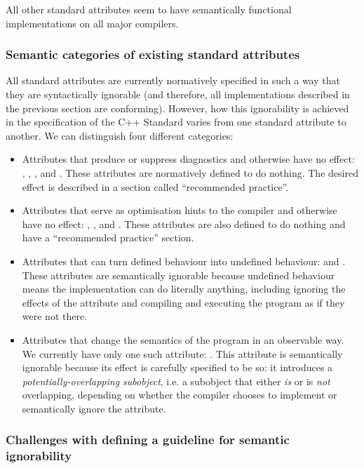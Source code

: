 All other standard attributes seem to have semantically functional implementations on all major compilers.

\subsubsection{Semantic categories of existing standard attributes}
\label{subsubsec:attributecategories}

All standard attributes are currently normatively specified in such a way that they are syntactically ignorable (and therefore, all implementations described in the previous section are conforming). However, how this ignorability is achieved in the specification of the C++ Standard varies from one standard attribute to another. We can distinguish four different categories:

\begin{itemize}
\item Attributes that produce or suppress diagnostics and otherwise have no effect: , , , and . These attributes are normatively defined to do nothing. The desired effect is described in a section called ``recommended practice''.
\item Attributes that serve as optimisation hints to the compiler and otherwise have no effect: , , and . These attributes are also defined to do nothing and have a ``recommended practice'' section.
\item Attributes that can turn defined behaviour into undefined behaviour:  and . These attributes are semantically ignorable because undefined behaviour means the implementation can do literally anything, including ignoring the effects of the attribute and compiling and executing the program as if they were not there.
\item Attributes that change the semantics of the program in an observable way. We currently have only one such attribute: . This attribute is semantically ignorable because its effect is carefully specified to be so: it introduces a \emph{potentially-overlapping subobject}, i.e. a subobject that either \emph{is} or is \emph{not} overlapping, depending on whether the compiler chooses to implement or semantically ignore the attribute.
\end{itemize}

\subsubsection{Challenges with defining a guideline for semantic ignorability}
\label{subsubsec:challenges}

